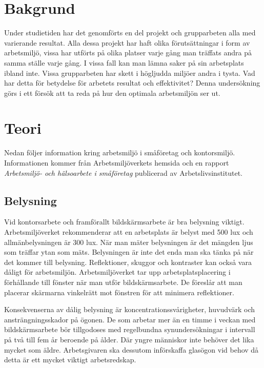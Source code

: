 \section{Bakgrund}
\label{sec:background-hampus}

Under studietiden har det genomförts en del projekt och grupparbeten alla med varierande resultat. Alla dessa projekt har haft olika förutsättningar i form av arbetsmiljö, vissa har utförts på olika platser varje gång man träffats andra på samma ställe varje gång. I vissa fall kan man lämna saker på sin arbetsplats ibland inte. Vissa grupparbeten har skett i högljudda miljöer andra i tysta. Vad har detta för betydelse för arbetets resultat och effektivitet? Denna undersökning görs i ett försök att ta reda på hur den optimala arbetsmiljön ser ut. 

\section{Teori}
\label{sec:theory-hampus}
Nedan följer information kring arbetsmiljö i småföretag och kontorsmiljö. Informationen kommer från Arbetsmiljöverkets hemsida och en rapport \textit{Arbetsmiljö- och hälsoarbete i småföretag} publicerad av Arbetslivsinstitutet.

\subsection{Belysning}
Vid kontorsarbete och framförallt bildskärmsarbete är bra belysning viktigt. Arbetsmiljöverket rekommenderar att en arbetsplats är belyst med 500 lux och allmänbelysningen är 300 lux. När man mäter belysningen är det mängden ljus som träffar ytan som mäts. Belysningen är inte det enda man ska tänka på när det kommer till belysning. Reflektioner, skuggor och kontraster kan också vara dåligt för arbetsmiljön. Arbetsmiljöverket tar upp arbetsplatsplacering i förhållande till fönster när man utför bildskärmsarbete. De föreslår att man placerar skärmarna vinkelrätt mot fönstren för att minimera reflektioner. \cite{AVLjus}\cite{AVDator}

Konsekvenserna av dålig belysning är koncentrationssvårigheter, huvudvärk och ansträngningsskador på ögonen. De som arbetar mer än en timme i veckan med bildskärmsarbete bör tillgodoses med regelbundna synundersökningar i intervall på två till fem år beroende på ålder. Där yngre människor inte behöver det lika mycket som äldre. Arbetsgivaren ska dessutom införskaffa glasögon vid behov då detta är ett mycket viktigt arbetsredskap.\cite{AVLjus}

